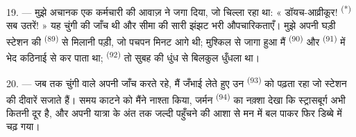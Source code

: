 \VUsaut{3.0mm}
\VUsaut{3.0mm}

19. --- मुझे अचानक एक कर्मचारी की आवाज़ ने जगा दिया, जो चिल्ला रहा था:
« डॉयच-आव्रीकूर! \textsuperscript{(*)} सब उतरें! » यह चुंगी की जाँच थी और सीमा की
सारी झंझट भरी औपचारिकताएँ। मुझे अपनी घड़ी स्टेशन की 
\textsuperscript{(89)} से मिलानी पड़ी, जो पचपन मिनट आगे थी; मुश्किल से जागा हुआ मैं
 \textsuperscript{(90)} और  \textsuperscript{(91)} में
भेद कठिनाई से कर पाता था;  \textsuperscript{(92)} तो सुबह की धुंध से
बिलकुल धुँधला था।

20. --- जब तक चुंगी वाले अपनी जाँच करते रहे, मैं जँभाई लेते हुए उन
 \textsuperscript{(93)} को पढ़ता रहा जो स्टेशन की दीवारें सजाते
हैं। समय काटने को मैंने नाश्ता किया, जर्मन  \textsuperscript{(94)} का
नक़्शा देखा कि स्ट्रासबूर्ग अभी कितनी दूर है, और अपनी यात्रा के अंत तक जल्दी
पहुँचने की आशा से मन में बल पाकर फिर डिब्बे में चढ़ गया।
\VUsaut{6.0mm}
\VUfilet{22mm}
